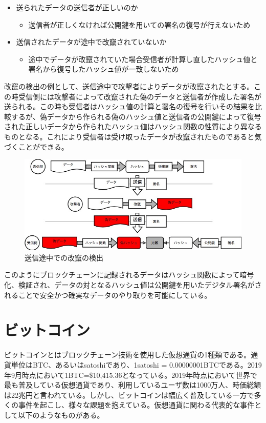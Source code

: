 \documentclass[12pt]{jarticle}
\begin{document}
\begin{itemize}
\item 送られたデータの送信者が正しいのか
	\begin{itemize}
	\item 送信者が正しくなければ公開鍵を用いての署名の復号が行えないため
	\end{itemize}
\item 送信されたデータが途中で改竄されていないか
	\begin{itemize}
	\item 途中でデータが改竄されていた場合受信者が計算し直したハッシュ値と署名から復号したハッシュ値が一致しないため
	\end{itemize}
\end{itemize}

改竄の検出の例として、送信途中で攻撃者によりデータが改竄されたとする。この時受信側には攻撃者によって改竄された偽のデータと送信者が作成した署名が送られる。この時も受信者はハッシュ値の計算と署名の復号を行いその結果を比較するが、偽データから作られる偽のハッシュ値と送信者の公開鍵によって復号された正しいデータから作られたハッシュ値はハッシュ関数の性質により異なるものとなる。これにより受信者は受け取ったデータが改竄されたものであると気づくことができる。

\begin{figure}[h]
 \centering
   \includegraphics[width=120mm]{figures/signature-attack.jpg}
 \caption{送信途中での改竄の検出}
 \label{attack}
\end{figure}

このようにブロックチェーンに記録されるデータはハッシュ関数によって暗号化、検証され、データの対となるハッシュ値は公開鍵を用いたデジタル署名がされることで安全かつ確実なデータのやり取りを可能にしている。


\section{ビットコイン}
ビットコインとはブロックチェーン技術を使用した仮想通貨の1種類である。通貨単位はBTC、あるいはsatoshiであり、1satoshi = 0.00000001BTCである。2019年9月時点において1BTC=\$10,415.36となっている。2019年時点において世界で最も普及している仮想通貨であり、利用しているユーザ数は1000万人、時価総額は22兆円と言われている。しかし、ビットコインは幅広く普及している一方で多くの事件を起こし、様々な課題を抱えている。仮想通貨に関わる代表的な事件として以下のようなものがある。
\end{document}
